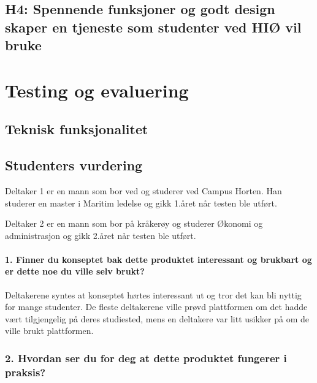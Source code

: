 \subsection{H4: Spennende funksjoner og godt design skaper en tjeneste som studenter ved HIØ vil bruke}


\section{Testing og evaluering}

\subsection{Teknisk funksjonalitet}

\subsection{Studenters vurdering}
Deltaker 1 er en mann som bor ved og studerer ved Campus Horten. Han studerer en master i Maritim ledelse og gikk 1.året når testen ble utført.

Deltaker 2 er en mann som bor på kråkerøy og studerer Økonomi og administrasjon og gikk 2.året når testen ble utført. %
\paragraph{1. Finner du konseptet bak dette produktet interessant og brukbart og er dette noe du ville selv brukt?}
Deltakerene syntes at konseptet hørtes interessant ut og tror det kan bli nyttig for mange studenter. De fleste deltakerene ville prøvd plattformen om det hadde vært tilgjengelig på deres studiested, mens en deltakere var litt usikker på om de ville brukt plattformen.

\subsubsection{2. Hvordan ser du for deg at dette produktet fungerer i praksis?}

